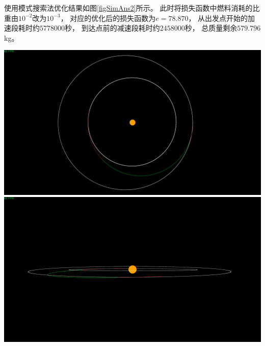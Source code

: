 使用模式搜索法优化结果如图\ref{figSimAns2}所示。
此时将损失函数中燃料消耗的比重由$10^{-2}$改为$10^{-3}$，
对应的优化后的损失函数为$e=78.870$，
从出发点开始的加速段耗时约$5778000$秒，
到达点前的减速段耗时约$2458000$秒，
总质量剩余$579.796$kg。
\begin{center}
	\includegraphics[scale=0.2]{simans3.png}  \\
	\includegraphics[scale=0.2]{simans4.png}  \\
	\label{figSimAns2}
\end{center}

